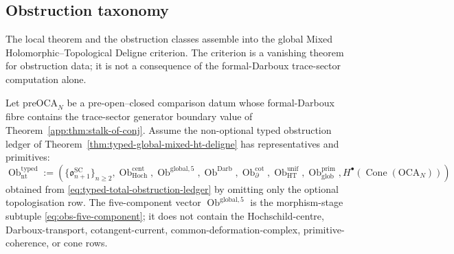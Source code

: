 \subsection{Obstruction taxonomy}\label{app:hfc:obstruction-taxonomy}

The local theorem and the obstruction classes assemble into the global
Mixed Holomorphic--Topological Deligne criterion.  The criterion is a
vanishing theorem for obstruction data; it is not a consequence of the
formal-Darboux trace-sector computation alone.

\begin{thm}\label{app:thm:global-deligne-criterion}
Let \(\mathrm{preOCA}_N\) be a pre-open--closed comparison datum whose
formal-Darboux fibre contains the trace-sector generator boundary value of
Theorem~\ref{app:thm:stalk-of-conj}.  Assume the non-optional typed
obstruction ledger of Theorem~\ref{thm:typed-global-mixed-ht-deligne}
has representatives and primitives:
\[
  \operatorname{Ob}^{\mathrm{typed}}_{\mathrm{nt}}
  :=
  \left(
    \{\mathfrak o^{\mathrm{SC}}_{n+1}\}_{n\ge2},
    \operatorname{Ob}^{\mathrm{cent}}_{\mathrm{Hoch}},
    \operatorname{Ob}^{\mathrm{global},5},
    \operatorname{Ob}^{\mathrm{Darb}},
    \operatorname{Ob}^{\mathrm{cot}}_\partial,
    \operatorname{Ob}^{\mathrm{unif}}_{\mathrm{HT}},
    \operatorname{Ob}^{\mathrm{prim}}_{\mathrm{glob}},
    H^\bullet\!\left(\operatorname{Cone}(\mathrm{OCA}_N)\right)
  \right)
\]
obtained from \eqref{eq:typed-total-obstruction-ledger} by omitting only
the optional topologisation row.  The five-component vector
\(\operatorname{Ob}^{\mathrm{global},5}\) is the morphism-stage subtuple
\eqref{eq:obs-five-component}; it does not contain the
Hochschild-centre, Darboux-transport, cotangent-current,
common-deformation-complex, primitive-coherence, or cone rows.


\end{thm}
